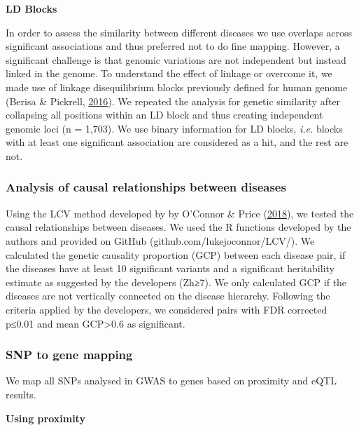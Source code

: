 \documentclass[12pt,twoside]{unicam}
\begin{document}
\textbf{LD Blocks}

In order to assess the similarity between different diseases we use overlaps across significant associations and thus preferred not to do fine mapping. However, a significant challenge is that genomic variations are not independent but instead linked in the genome. To understand the effect of linkage or overcome it, we made use of linkage disequilibrium blocks previously defined for human genome (Berisa \& Pickrell, \protect\hyperlink{ref-Berisa2016}{2016}). We repeated the analysis for genetic similarity after collapsing all positions within an LD block and thus creating independent genomic loci (n = 1,703). We use binary information for LD blocks, \emph{i.e.} blocks with at least one significant association are considered as a hit, and the rest are not.

\hypertarget{analysis-of-causal-relationships-between-diseases}{%
\subsubsection{Analysis of causal relationships between diseases}\label{analysis-of-causal-relationships-between-diseases}}

Using the LCV method developed by by O'Connor \& Price (\protect\hyperlink{ref-OConnor2018}{2018}), we tested the causal relationships between diseases. We used the R functions developed by the authors and provided on GitHub (github.com/lukejoconnor/LCV/). We calculated the genetic causality proportion (GCP) between each disease pair, if the diseases have at least 10 significant variants and a significant heritability estimate as suggested by the developers (Zh≥7). We only calculated GCP if the diseases are not vertically connected on the disease hierarchy. Following the criteria applied by the developers, we considered pairs with FDR corrected p≤0.01 and mean GCP\textgreater0.6 as significant.

\hypertarget{snp-to-gene-mapping}{%
\subsubsection{SNP to gene mapping}\label{snp-to-gene-mapping}}

We map all SNPs analysed in GWAS to genes based on proximity and eQTL results.

\textbf{Using proximity}
\end{document}
